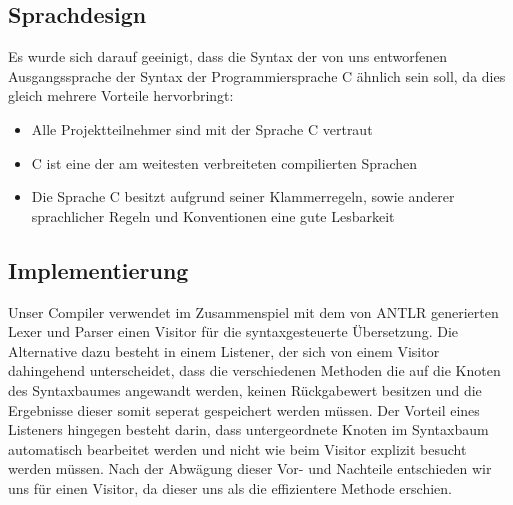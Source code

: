 \subsection{Sprachdesign}
Es wurde sich darauf geeinigt, dass die Syntax der von uns entworfenen Ausgangssprache der Syntax der Programmiersprache C ähnlich sein soll, da dies gleich mehrere Vorteile hervorbringt:
\begin{itemize}
\item Alle Projektteilnehmer sind mit der Sprache C vertraut
\item C ist eine der am weitesten verbreiteten compilierten Sprachen
\item Die Sprache C besitzt aufgrund seiner Klammerregeln, sowie anderer sprachlicher Regeln und Konventionen eine gute Lesbarkeit
\end{itemize}

\subsection{Implementierung}
Unser Compiler verwendet im Zusammenspiel mit dem von ANTLR generierten Lexer und Parser einen Visitor für die syntaxgesteuerte Übersetzung. Die Alternative dazu besteht in einem Listener, der sich von einem Visitor dahingehend unterscheidet, dass die verschiedenen Methoden die auf die Knoten des Syntaxbaumes angewandt werden, keinen Rückgabewert besitzen und die Ergebnisse dieser somit seperat gespeichert werden müssen. Der Vorteil eines Listeners hingegen besteht darin, dass untergeordnete Knoten im Syntaxbaum automatisch bearbeitet werden und nicht wie beim Visitor explizit besucht werden müssen. Nach der Abwägung dieser Vor- und Nachteile entschieden wir uns für einen Visitor, da dieser uns als die effizientere Methode erschien.



